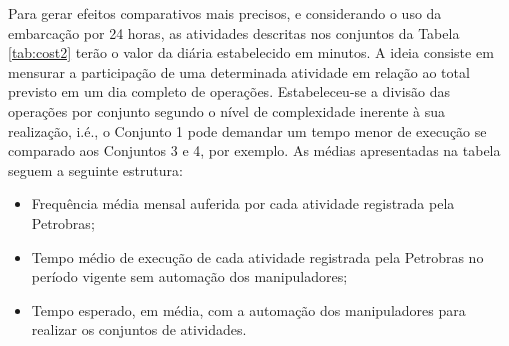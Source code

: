 Para gerar efeitos comparativos mais precisos, e considerando o uso da embarcação por 24 horas, as atividades descritas nos conjuntos da Tabela \ref{tab:cost2} terão o valor da diária estabelecido em minutos. A ideia consiste em mensurar a participação de uma determinada atividade em relação ao total previsto em um dia completo de operações. 
Estabeleceu-se a divisão das operações por conjunto segundo o nível de complexidade inerente à sua realização, i.é., o Conjunto 1 pode demandar um tempo menor de execução se comparado aos Conjuntos 3 e 4, por exemplo. As médias apresentadas na tabela seguem a seguinte estrutura:

\begin{itemize}
	\item Frequência média mensal auferida por cada atividade registrada pela Petrobras;
	\item Tempo médio de execução de cada atividade registrada pela Petrobras no período vigente sem automação dos manipuladores;
	\item Tempo esperado, em média, com a automação dos manipuladores para realizar os conjuntos de atividades.
\end{itemize}

